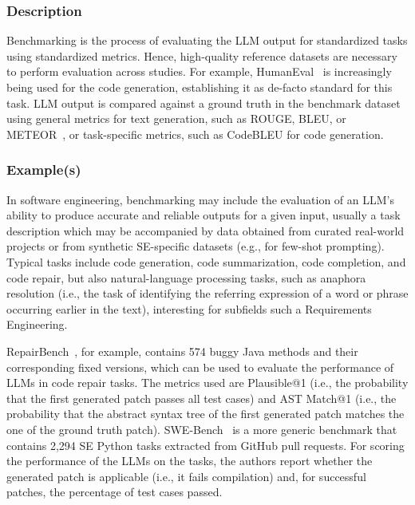 \subsubsection{Description}

Benchmarking is the process of evaluating the LLM output for standardized tasks using standardized metrics.
Hence, high-quality reference datasets are necessary to perform evaluation across studies.
For example, HumanEval~\cite{DBLP:journals/corr/abs-2107-03374} is increasingly being used for the code generation, establishing it as de-facto standard for this task.   
LLM output is compared against a ground truth in the benchmark dataset using general metrics for text generation, such as ROUGE, BLEU, or METEOR~\cite{10.1145/3695988}, or task-specific metrics, such as CodeBLEU for code generation.

\subsubsection{Example(s)}

In software engineering, benchmarking may include the evaluation of an LLM's ability to produce accurate and reliable outputs for a given input, usually a task description which may be accompanied by data obtained from curated real-world projects or from synthetic SE-specific datasets (e.g., for few-shot prompting).
Typical tasks include code generation, code summarization, code completion, and code repair, but also natural-language processing tasks, such as anaphora resolution (i.e., the task of identifying the referring expression of a word or phrase occurring earlier in the text), interesting for subfields such a Requirements Engineering. 

RepairBench~\cite{silva2024repairbench}, for example, contains 574 buggy Java methods and their corresponding fixed versions, which can be used to evaluate the performance of LLMs in code repair tasks.
The metrics used are Plausible@1 (i.e., the probability that the first generated patch passes all test cases) and AST Match@1 (i.e., the probability that the abstract syntax tree of the first generated patch matches the one of the ground truth patch).
SWE-Bench~\cite{DBLP:conf/iclr/JimenezYWYPPN24} is a more generic benchmark that contains 2,294 SE Python tasks extracted from GitHub pull requests.
For scoring the performance of the LLMs on the tasks, the authors report whether the generated patch is applicable (i.e., it fails compilation) and, for successful patches, the percentage of test cases passed.

